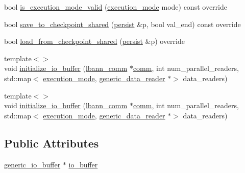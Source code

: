 \begin{DoxyCompactItemize}
\item 
bool \hyperlink{classlbann_1_1generic__input__layer_a31082076a8aad937eef3cadc0b5e1b27}{is\+\_\+execution\+\_\+mode\+\_\+valid} (\hyperlink{base_8hpp_a2781a159088df64ed7d47cc91c4dc0a8}{execution\+\_\+mode} mode) const override
\item 
bool \hyperlink{classlbann_1_1generic__input__layer_abae61e13f47205491a43e4842808945d}{save\+\_\+to\+\_\+checkpoint\+\_\+shared} (\hyperlink{classlbann_1_1persist}{persist} \&p, bool val\+\_\+end) const override
\item 
bool \hyperlink{classlbann_1_1generic__input__layer_ae5a542333eaf447a05fc586848e7c94c}{load\+\_\+from\+\_\+checkpoint\+\_\+shared} (\hyperlink{classlbann_1_1persist}{persist} \&p) override
\item 
{\footnotesize template$<$$>$ }\\void \hyperlink{classlbann_1_1generic__input__layer_ab0afac3b3a3ee9e7af81c0885d233756}{initialize\+\_\+io\+\_\+buffer} (\hyperlink{classlbann_1_1lbann__comm}{lbann\+\_\+comm} $\ast$\hyperlink{file__io_8cpp_ab048c6f9fcbcfaa57ce68b00263dbebe}{comm}, int num\+\_\+parallel\+\_\+readers, std\+::map$<$ \hyperlink{base_8hpp_a2781a159088df64ed7d47cc91c4dc0a8}{execution\+\_\+mode}, \hyperlink{classlbann_1_1generic__data__reader}{generic\+\_\+data\+\_\+reader} $\ast$$>$ data\+\_\+readers)
\item 
{\footnotesize template$<$$>$ }\\void \hyperlink{classlbann_1_1generic__input__layer_ab0afac3b3a3ee9e7af81c0885d233756}{initialize\+\_\+io\+\_\+buffer} (\hyperlink{classlbann_1_1lbann__comm}{lbann\+\_\+comm} $\ast$\hyperlink{file__io_8cpp_ab048c6f9fcbcfaa57ce68b00263dbebe}{comm}, int num\+\_\+parallel\+\_\+readers, std\+::map$<$ \hyperlink{base_8hpp_a2781a159088df64ed7d47cc91c4dc0a8}{execution\+\_\+mode}, \hyperlink{classlbann_1_1generic__data__reader}{generic\+\_\+data\+\_\+reader} $\ast$$>$ data\+\_\+readers)
\end{DoxyCompactItemize}
\subsection*{Public Attributes}
\begin{DoxyCompactItemize}
\item 
\hyperlink{classlbann_1_1generic__io__buffer}{generic\+\_\+io\+\_\+buffer} $\ast$ \hyperlink{classlbann_1_1generic__input__layer_a9dfe8b9afaebc7a5bcb0177ee2ab428f}{io\+\_\+buffer}
\end{DoxyCompactItemize}
